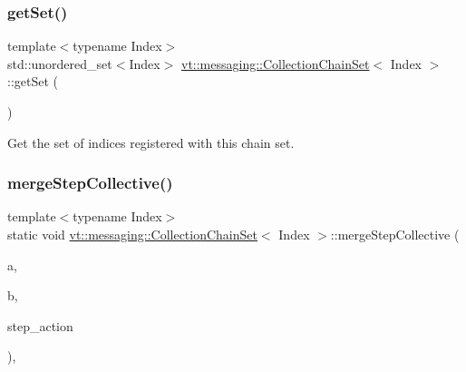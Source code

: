 \subsubsection{\texorpdfstring{get\+Set()}{getSet()}}
{\footnotesize\ttfamily template$<$typename Index$>$ \\
std\+::unordered\+\_\+set$<$Index$>$ \hyperlink{classvt_1_1messaging_1_1_collection_chain_set}{vt\+::messaging\+::\+Collection\+Chain\+Set}$<$ Index $>$\+::get\+Set (\begin{DoxyParamCaption}{ }\end{DoxyParamCaption})\hspace{0.3cm}{\ttfamily [inline]}}



Get the set of indices registered with this chain set. 

\mbox{\label{classvt_1_1messaging_1_1_collection_chain_set_a982745c451229365b57a15a87dc2999e}} 
\subsubsection{\texorpdfstring{merge\+Step\+Collective()}{mergeStepCollective()}\hspace{0.1cm}{\footnotesize\ttfamily [1/2]}}
{\footnotesize\ttfamily template$<$typename Index$>$ \\
static void \hyperlink{classvt_1_1messaging_1_1_collection_chain_set}{vt\+::messaging\+::\+Collection\+Chain\+Set}$<$ Index $>$\+::merge\+Step\+Collective (\begin{DoxyParamCaption}\item[{\hyperlink{classvt_1_1messaging_1_1_collection_chain_set}{Collection\+Chain\+Set}$<$ Index $>$ \&}]{a,  }\item[{\hyperlink{classvt_1_1messaging_1_1_collection_chain_set}{Collection\+Chain\+Set}$<$ Index $>$ \&}]{b,  }\item[{std\+::function$<$ \hyperlink{structvt_1_1messaging_1_1_pending_send}{Pending\+Send}(Index)$>$}]{step\+\_\+action }\end{DoxyParamCaption})\hspace{0.3cm}{\ttfamily [inline]}, {\ttfamily [static]}}



